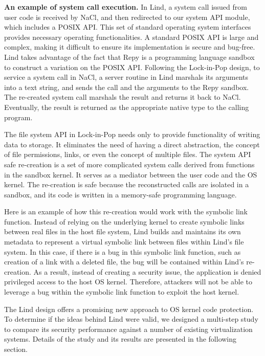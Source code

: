 \textbf{An example of system call execution.}
In Lind, a system call issued from user code is
received by NaCl, and then redirected to our system API module, which
includes a POSIX API. This set of standard
operating system interfaces provides
necessary operating functionalities. A standard POSIX API is large and complex,
making it difficult to ensure its implementation is secure and bug-free.
Lind takes advantage of the fact that Repy is a programming language sandbox to
construct a variation on the POSIX API. Following the
Lock-in-Pop design, to service a system call in NaCl, a server routine in
Lind marshals its arguments into a text string, and sends the call and the arguments
to the Repy sandbox. The re-created system call marshals the result and
returns it back to NaCl. Eventually, the result is returned as the appropriate
native type to the calling program.

The file system API in Lock-in-Pop needs only
to provide functionality of writing data to storage.
It eliminates the need of having a direct abstraction, the
concept of file permissions, links, or even the concept of multiple files.
The system API safe re-creation is a set of more complicated system calls
derived from functions in the sandbox kernel.
It serves as a mediator between the user code
and the OS kernel. The re-creation is safe
because the reconstructed calls are isolated in a sandbox, and its code is written
 in a memory-safe programming language.

Here is an example of how this re-creation would work with the symbolic link function. 
Instead of relying on the underlying kernel to create symbolic links between real files 
in the host file system, Lind builds and maintains its own metadata to represent a virtual symbolic link 
between files within Lind's file system. In this case, if there is a bug in this symbolic link function, 
such as creation of a link with a deleted file, the bug will be contained within Lind's re-creation. 
As a result, instead of creating a security issue, the application is denied privileged access
to the host OS kernel. 
Therefore, attackers will not be able to leverage a bug within the symbolic link function to 
exploit the host kernel.  

The Lind design offers a promising new approach to OS kernel code protection.
 To determine if the ideas behind Lind were valid, we
designed a multi-step study to compare its security performance against a number
 of existing virtualization systems. Details of the study and its results are presented
 in the following section.